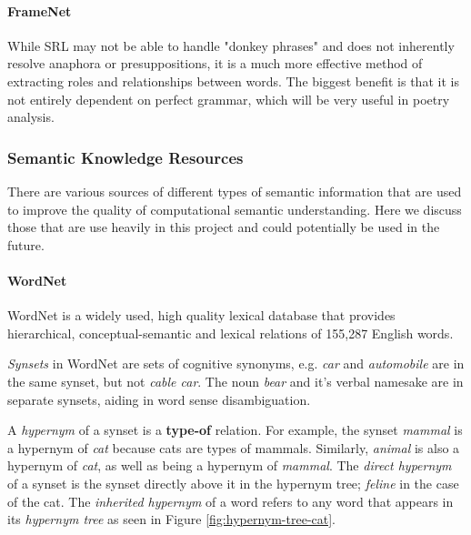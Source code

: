 \paragraph{FrameNet}

While SRL may not be able to handle "donkey phrases" and does not inherently resolve anaphora or presuppositions, it is a much more effective method of extracting roles and relationships between words. The biggest benefit is that it is not entirely dependent on perfect grammar, which will be very useful in poetry analysis.


\subsubsection{Semantic Knowledge Resources}
\label{sec:sem-net}
There are various sources of different types of semantic information that are used to improve the quality of computational semantic understanding. Here we discuss those that are use heavily in this project and could potentially be used in the future.

\paragraph{WordNet}
WordNet is a widely used, high quality lexical database that provides hierarchical, conceptual-semantic and lexical relations of 155,287 English words\cite{miller1995wordnet}. 

\textit{Synsets} in WordNet are sets of cognitive synonyms, e.g. \textit{car} and \textit{automobile} are in the same synset, but not \textit{cable car}. The noun \textit{bear} and it's verbal namesake are in separate synsets, aiding in word sense disambiguation.

A \textit{hypernym} of a synset is a \textbf{type-of} relation. For example, the synset \textit{mammal} is a hypernym of \textit{cat} because cats are types of mammals. Similarly, \textit{animal} is also a hypernym of \textit{cat}, as well as being a hypernym of \textit{mammal}. The \textit{direct hypernym} of a synset is the synset directly above it in the hypernym tree; \textit{feline} in the case of the cat. The \textit{inherited hypernym} of a word refers to any word that appears in its \textit{hypernym tree} as seen in Figure \ref{fig:hypernym-tree-cat}. 

